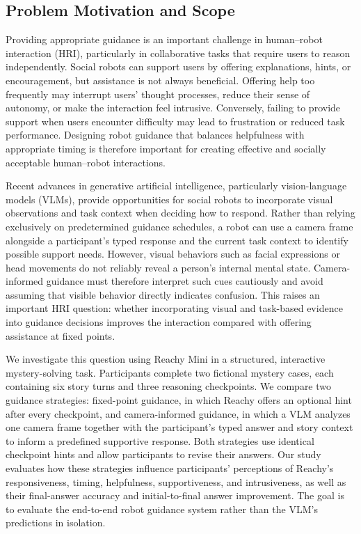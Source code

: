 \documentclass[conference]{IEEEtran}
\begin{document}
\subsection{Problem Motivation and Scope}

Providing appropriate guidance is an important challenge in human--robot interaction (HRI), particularly in collaborative tasks that require users to reason independently. Social robots can support users by offering explanations, hints, or encouragement, but assistance is not always beneficial. Offering help too frequently may interrupt users' thought processes, reduce their sense of autonomy, or make the interaction feel intrusive. Conversely, failing to provide support when users encounter difficulty may lead to frustration or reduced task performance. Designing robot guidance that balances helpfulness with appropriate timing is therefore important for creating effective and socially acceptable human--robot interactions.

Recent advances in generative artificial intelligence, particularly vision-language models (VLMs), provide opportunities for social robots to incorporate visual observations and task context when deciding how to respond. Rather than relying exclusively on predetermined guidance schedules, a robot can use a camera frame alongside a participant's typed response and the current task context to identify possible support needs. However, visual behaviors such as facial expressions or head movements do not reliably reveal a person's internal mental state. Camera-informed guidance must therefore interpret such cues cautiously and avoid assuming that visible behavior directly indicates confusion. This raises an important HRI question: whether incorporating visual and task-based evidence into guidance decisions improves the interaction compared with offering assistance at fixed points.

We investigate this question using Reachy Mini in a structured, interactive mystery-solving task. Participants complete two fictional mystery cases, each containing six story turns and three reasoning checkpoints. We compare two guidance strategies: fixed-point guidance, in which Reachy offers an optional hint after every checkpoint, and camera-informed guidance, in which a VLM analyzes one camera frame together with the participant's typed answer and story context to inform a predefined supportive response. Both strategies use identical checkpoint hints and allow participants to revise their answers. Our study evaluates how these strategies influence participants' perceptions of Reachy's responsiveness, timing, helpfulness, supportiveness, and intrusiveness, as well as their final-answer accuracy and initial-to-final answer improvement. The goal is to evaluate the end-to-end robot guidance system rather than the VLM's predictions in isolation.
\end{document}
